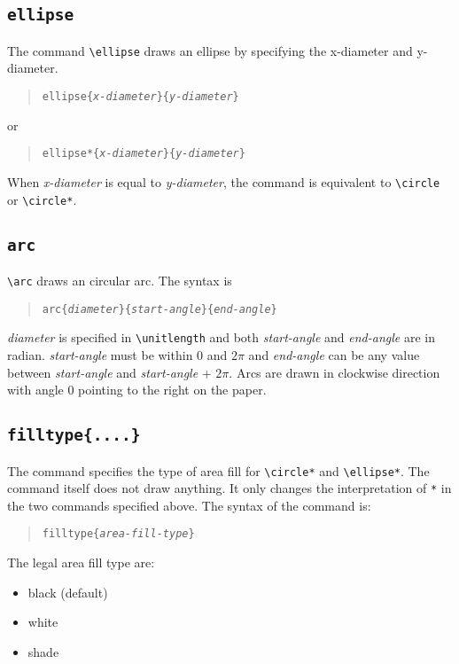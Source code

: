 \documentclass[11pt]{article}
\begin{document}
\subsection{\tt \BS ellipse}
The command \verb|\ellipse| draws an ellipse by specifying the
x-diameter and y-diameter.
\begin{quote}
\begin{alltt}
\BS{}ellipse\{{\em{}x-diameter}\}\{{\em{}y-diameter}\}
\end{alltt}
\end{quote}
or
\begin{quote}
\begin{alltt}
\BS{}ellipse*\{{\em{}x-diameter}\}\{{\em{}y-diameter}\}
\end{alltt}
\end{quote}
When {\em x-diameter} is equal to {\em y-diameter}, the command
is equivalent to \verb|\circle| or \verb|\circle*|.


\subsection{\tt \BS arc}
\verb|\arc| draws an circular arc. The syntax is
\begin{quote}
\begin{alltt}
\BS{}arc\{{\em{}diameter}\}\{{\em{}start-angle}\}\{{\em{}end-angle}\}
\end{alltt}
\end{quote}
{\em diameter} is specified in \verb|\unitlength| and both {\em
start-angle} and {\em end-angle} are in radian. {\em start-angle}
must be within 0 and $2\pi$ and {\em end-angle} can be any value
between {\em start-angle} and {\em start-angle} + $2\pi$. Arcs
are drawn in clockwise direction with angle 0 pointing to the
right on the paper.


\subsection{\tt \BS filltype\{....\}}
The command specifies the type of area fill for \verb|\circle*| and
\verb|\ellipse*|. The command itself does not draw anything. 
It only changes the interpretation of \verb|*| in the two commands
specified above.
The syntax of the command is:
\begin{quote}
\begin{alltt}
\BS{}filltype\{{\em{}area-fill-type}\}
\end{alltt}
\end{quote}
The legal area fill type are:
\begin{itemize}
\item black (default)
\item white
\item shade
\end{itemize}
\end{document}
